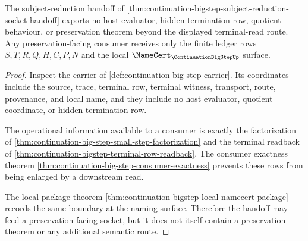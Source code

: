 \begin{theorem}
\label{thm:continuation-bigstep-preservation-boundary-nonescape}
The subject-reduction handoff of
\autoref{thm:continuation-bigstep-subject-reduction-socket-handoff} exports no
host evaluator, hidden termination row, quotient behaviour, or preservation
theorem beyond the displayed terminal-read route. Any preservation-facing
consumer receives only the finite ledger rows $S,T,R,Q,H,C,P,N$ and the local
$\NameCert_{\ContinuationBigStepUp}$ surface.
\end{theorem}
\begin{proof}
Inspect the carrier of \autoref{def:continuation-big-step-carrier}. Its
coordinates include the source, trace, terminal row, terminal witness,
transport, route, provenance, and local name, and they include no host
evaluator, quotient coordinate, or hidden termination row.

The operational information available to a consumer is exactly the
factorization of
\autoref{thm:continuation-big-step-small-step-factorization} and the terminal
readback of \autoref{thm:continuation-bigstep-terminal-row-readback}. The
consumer exactness theorem
\autoref{thm:continuation-big-step-consumer-exactness} prevents these rows
from being enlarged by a downstream read.

The local package theorem
\autoref{thm:continuation-bigstep-local-namecert-package} records the same
boundary at the naming surface. Therefore the handoff may feed a
preservation-facing socket, but it does not itself contain a preservation
theorem or any additional semantic route.
\end{proof}

